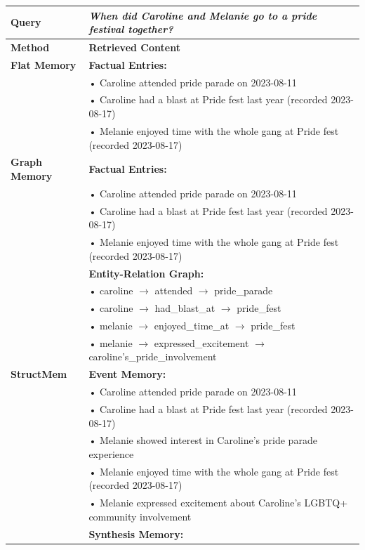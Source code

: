 \begin{table}[t]
\centering
\small
\begin{tabular}{p{2.5cm}p{13cm}}
\toprule
\textbf{Query} & \textit{When did Caroline and Melanie go to a pride festival together?} \\
\midrule
\textbf{Method} & \textbf{Retrieved Content} \\
\midrule
\textbf{Flat Memory} & 
\textbf{Factual Entries:} \\
& \quad • Caroline attended pride parade on 2023-08-11 \\
& \quad • Caroline had a blast at Pride fest last year (recorded 2023-08-17) \\
& \quad • Melanie enjoyed time with the whole gang at Pride fest (recorded 2023-08-17) \\
\midrule
\textbf{Graph Memory} & 
\textbf{Factual Entries:} \\
& \quad • Caroline attended pride parade on 2023-08-11 \\
& \quad • Caroline had a blast at Pride fest last year (recorded 2023-08-17) \\
& \quad • Melanie enjoyed time with the whole gang at Pride fest (recorded 2023-08-17) \\ 
& \textbf{Entity-Relation Graph:} \\
& \quad • caroline $\rightarrow$ attended $\rightarrow$ pride\_parade \\
& \quad • caroline $\rightarrow$ had\_blast\_at $\rightarrow$ pride\_fest \\
& \quad • melanie $\rightarrow$ enjoyed\_time\_at $\rightarrow$ pride\_fest \\
& \quad • melanie $\rightarrow$ expressed\_excitement $\rightarrow$ caroline's\_pride\_involvement \\
\midrule
\textbf{StructMem} &
\textbf{Event Memory:} \\
& \quad • Caroline attended pride parade on 2023-08-11 \\
& \quad • Caroline had a blast at Pride fest last year (recorded 2023-08-17) \\
& \quad • Melanie showed interest in Caroline's pride parade experience \\
& \quad • Melanie enjoyed time with the whole gang at Pride fest (recorded 2023-08-17) \\ 
& \quad • Melanie expressed excitement about Caroline's LGBTQ+ community involvement \\
& \textbf{Synthesis Memory:} \\

\end{tabular}
\end{table}
